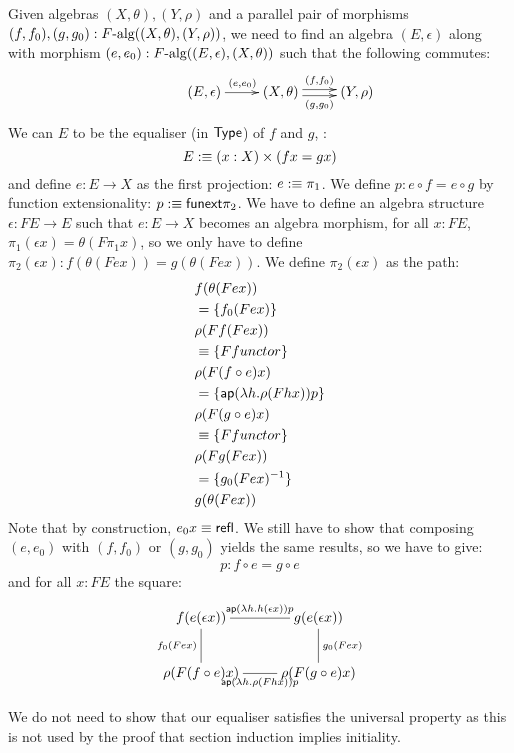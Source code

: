 \documentclass[a4paper,10pt]{article}
\begin{document}
Given algebras $(X,\theta), (Y,\rho)$ and a parallel pair of morphisms
$(f,f_0),(g,g_0) : F\mbox{-alg}((X,\theta),(Y,\rho))$, we need to find
an algebra $(E,\epsilon)$ along with morphism
$(e,e_0) : F\mbox{-alg}((E,\epsilon),(X,\theta))$ such that the
following commutes:
$$
\xymatrix{ &(E,\epsilon) \ar[r]^{(e,e_0)} &(X,\theta) \ar@<-.5ex>[r]_-{(g,g_0)}
  \ar@<.5ex>[r]^-{(f,f_0)} &(Y,\rho) }
$$
We can $E$ to be the equaliser (in $\mathsf{Type}$) of $f$ and $g$, \ie:
$$
E :\equiv (x : X) \times (f x = g x)
$$
and define $e : E \to X$ as the first projection: $e :\equiv \pi_1$.
We define $p : e \circ f = e \circ g$ by function extensionality:
$p :\equiv \mathsf{funext} \pi_2$. We have to define an algebra
structure $\epsilon : FE \to E$ such that $e : E \to X$ becomes an
algebra morphism, \ie for all $x : FE$,
$\pi_1 (\epsilon x) = \theta (F \pi_1 x)$, so we only have to define
$\pi_2 (\epsilon x) : f (\theta (F e x)) = g (\theta (F e x))$. We
define $\pi_2 (\epsilon x)$ as the path:
%
\begin{align*}
  &f (\theta (F e x)) \\
  &= \{ f_0 (F e x) \} \\
  &\rho (F f (F e x)) \\
  &\equiv \{ F functor \} \\
  &\rho (F (f \circ e) x) \\
  &= \{ \mathsf{ap} (\lambda h . \rho (F h x)) p \} \\
  &\rho (F (g \circ e) x) \\
  &\equiv \{ F functor \} \\
  &\rho (F g (F e x)) \\
  &= \{ g_0 (F e x) ^{-1} \} \\
  &g (\theta (F e x))
\end{align*}
%
Note that by construction, $e_0 x \equiv \operatorname{\mathsf{refl}}$. We still have to show
that composing $(e,e_0)$ with $(f,f_0)$ or $(g,g_0)$ yields the same
results, so we have to give:
$$
p : f \circ e = g \circ e
$$
and for all $x : FE$ the square:
$$
\xymatrix{
f (e (\epsilon x)) 
  \ar@{-}[r]^{\ap (\lambda h . h (\epsilon x)) p} 
  \ar@{-}[d]_{f_0 (F e x)}  
&g (e (\epsilon x)) 
  \ar@{-}[d]^{g_0 (F e x)}
\\
\rho (F (f \circ e) x)
  \ar@{-}[r]_{\ap (\lambda h . \rho (F h x)) p}
&\rho (F (g \circ e) x)}
$$


We do not need to show that our equaliser satisfies the universal
property as this is not used by the proof that section induction
implies initiality.
\end{document}
